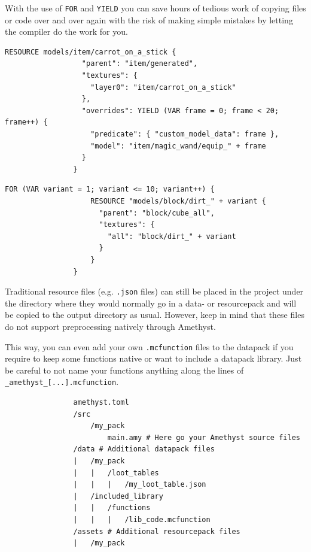 \documentclass[12pt]{article}
\begin{document}
            With the use of \lstinline{FOR} and \lstinline{YIELD} you can save hours of tedious work of copying files or code over and over again with the risk of making simple mistakes by letting the compiler do the work for you.
            
            \begin{lstlisting}[title=src/minecraft/magic\_wand.amy]
                RESOURCE models/item/carrot_on_a_stick {
                  "parent": "item/generated",
                  "textures": {
                    "layer0": "item/carrot_on_a_stick"
                  },
                  "overrides": YIELD (VAR frame = 0; frame < 20; frame++) {
                    "predicate": { "custom_model_data": frame }, 
                    "model": "item/magic_wand/equip_" + frame 
                  }
                }
            \end{lstlisting}
            
            \begin{lstlisting}[title=src/minecraft/dirt\_variants.amy]
                FOR (VAR variant = 1; variant <= 10; variant++) {
                    RESOURCE "models/block/dirt_" + variant {
                      "parent": "block/cube_all",
                      "textures": {
                        "all": "block/dirt_" + variant
                      }
                    }
                }
            \end{lstlisting}
            
            Traditional resource files (e.g. \lstinline{.json} files) can still be placed in the project under the directory where they would normally go in a data- or resourcepack and will be copied to the output directory as usual. However, keep in mind that these files do not support preprocessing natively through Amethyst.
            
            This way, you can even add your own \lstinline{.mcfunction} files to the datapack if you require to keep some functions native or want to include a datapack library. Just be careful to not name your functions anything along the lines of \lstinline{_amethyst_[...].mcfunction}.
            
            \label{fig:file_tree} \begin{lstlisting}
                amethyst.toml
                /src
                    /my_pack
                        main.amy # Here go your Amethyst source files
                /data # Additional datapack files
                |   /my_pack
                |   |   /loot_tables
                |   |   |   /my_loot_table.json
                |   /included_library
                |   |   /functions
                |   |   |   /lib_code.mcfunction
                /assets # Additional resourcepack files
                |   /my_pack
            \end{lstlisting}
            
\end{document}
